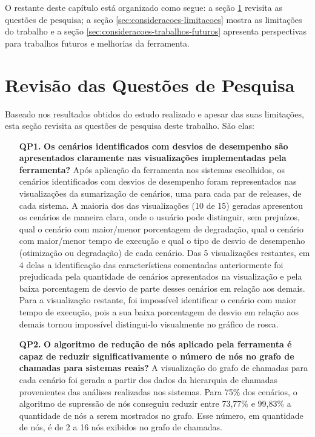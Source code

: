 O restante deste capítulo está organizado como segue: a seção \ref{sec:consideracoes-questoes-pesquisa} revisita as questões de pesquisa; a seção \ref{sec:consideracoes-limitacoes} mostra as limitações do trabalho e a seção \ref{sec:consideracoes-trabalhos-futuros} apresenta perspectivas para trabalhos futuros e melhorias da ferramenta.

\section{Revisão das Questões de Pesquisa} \label{sec:consideracoes-questoes-pesquisa}

Baseado nos resultados obtidos do estudo realizado e apesar das suas limitações, esta seção revisita as questões de pesquisa deste trabalho. São elas:

\begin{itemize}
  \item[\textbf{QP1.}] \textbf{Os cenários identificados com desvios de desempenho são apresentados claramente nas visualizações implementadas pela ferramenta?} Após aplicação da ferramenta nos sistemas escolhidos, os cenários identificados com desvios de desempenho foram representados nas visualizações da sumarização de cenários, uma para cada par de releases, de cada sistema. A maioria dos das visualizações (10 de 15) geradas apresentou os cenários de maneira clara, onde o usuário pode distinguir, sem prejuízos, qual o cenário com maior/menor porcentagem de degradação, qual o cenário com maior/menor tempo de execução e qual o tipo de desvio de desempenho (otimização ou degradação) de cada cenário. Das 5 visualizações restantes, em 4 delas a identificação das características comentadas anteriormente foi prejudicada pela quantidade de cenários apresentados na visualização e pela baixa porcentagem de desvio de parte desses cenários em relação aos demais. Para a visualização restante, foi impossível identificar o cenário com maior tempo de execução, pois a sua baixa porcentagem de desvio em relação aos demais tornou impossível distingui-lo visualmente no gráfico de rosca.
  \item[\textbf{QP2.}] \textbf{O algoritmo de redução de nós aplicado pela ferramenta é capaz de reduzir significativamente o número de nós no grafo de chamadas para sistemas reais?} A visualização do grafo de chamadas para cada cenário foi gerada a partir dos dados da hierarquia de chamadas provenientes das análises realizadas nos sistemas. Para 75\% dos cenários, o algoritmo de supressão de nós conseguiu reduzir entre 73,77\% e 99,83\% a quantidade de nós a serem mostrados no grafo. Esse número, em quantidade de nós, é de 2 a 16 nós exibidos no grafo de chamadas.

\end{itemize}
